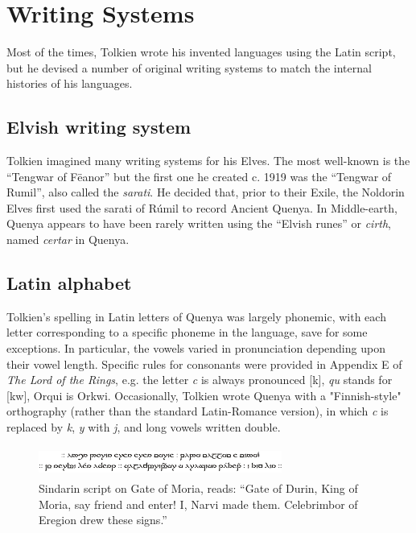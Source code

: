 \documentclass[pub]{apa6}
\begin{document}
\section{Writing Systems}
\indent Most of the times, Tolkien wrote his invented languages using the Latin script, but he devised a number of original writing systems to match the internal histories of his languages.\\

\subsection{Elvish writing system}
Tolkien imagined many writing systems for his Elves. The most well-known is the ``Tengwar of F\"eanor'' but the first one he created c. 1919 was the ``Tengwar of Rumil'', also called the {\it sarati}. He decided that, prior to their Exile, the Noldorin Elves first used the sarati of R\'umil to record Ancient Quenya. In Middle-earth, Quenya appears to have been rarely written using the ``Elvish runes'' or {\it cirth}, named {\it certar} in Quenya.\\

\subsection{Latin alphabet}
Tolkien's spelling in Latin letters of Quenya was largely phonemic, with each letter corresponding to a specific phoneme in the language, save for some exceptions. In particular, the vowels varied in pronunciation depending upon their vowel length. Specific rules for consonants were provided in Appendix E of {\it The Lord of the Rings}, e.g. the letter {\it c} is always pronounced [k], {\it qu} stands for [kw], Orqui is Orkwi. Occasionally, Tolkien wrote Quenya with a "Finnish-style" orthography (rather than the standard Latin-Romance version), in which {\it c} is replaced by {\it k}, {\it y} with {\it j}, and long vowels written double.\\

\begin{figure}
\bigskip
\begin{center}
\includegraphics[width=80mm, height=10mm]{sindarin.png}
\end{center}
\caption{Sindarin script on Gate of Moria, reads: ``Gate of Durin, King of Moria, say friend and enter!  I, Narvi made them. Celebrimbor of Eregion drew these signs.''}
\end{figure}
\end{document}
